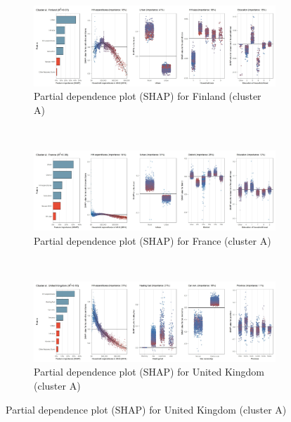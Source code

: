 \begin{figure}[ht!]\ContinuedFloat
    \centering
   \begin{subfigure}[b]{\textwidth}
         \centering
         \caption{Partial dependence plot (SHAP) for Finland (cluster A)}
         \label{fig:5b_FIN}
         \includegraphics[width=\textwidth]{Figure 5b/Figure_5b_FIN}    
     \end{subfigure}
    \\
    \vspace{0.5cm}
   \begin{subfigure}[b]{\textwidth}
         \centering
         \caption{Partial dependence plot (SHAP) for France (cluster A)}
         \label{fig:5b_FRA}
         \includegraphics[width=\textwidth]{Figure 5b/Figure_5b_FRA} \end{subfigure}
    \\
    \vspace{0.5cm}
   \begin{subfigure}[b]{\textwidth}
         \centering
         \caption{Partial dependence plot (SHAP) for United Kingdom (cluster A)}
         \label{fig:5b_GBR}
         \includegraphics[width=\textwidth]{Figure 5b/Figure_5b_GBR}

\end{subfigure}
\end{figure}
